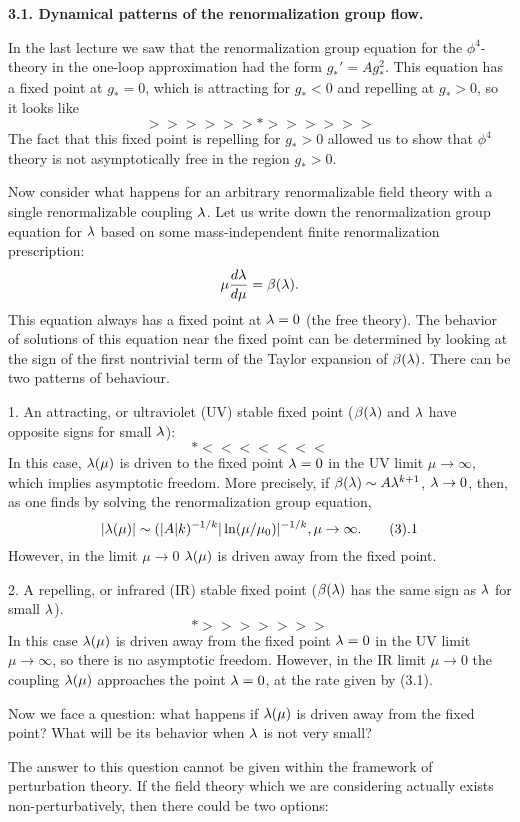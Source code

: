 {\bf 3.1. Dynamical patterns of the renormalization group flow.} 

In the last lecture we saw that the renormalization group equation
for the $\phi^4$-theory in the one-loop approximation had the form
$g_*'=Ag_*^2$. This equation has a fixed point at $g_*=0$, which is attracting
for $g_*<0$ and repelling at $g_*>0$, so it looks like
$$
>>>>>>*>>>>>> 
$$
The fact that this fixed point is repelling for $g_*>0$ allowed us to 
show that $\phi^4$ theory is not asymptotically free in the region $g_*>0$. 

Now consider  what happens for an arbitrary renormalizable field theory
with a single renormalizable coupling $\lambda$. 
Let us write down the renormalization group equation for $\lambda$ based on
some mass-independent finite renormalization prescription:
$$
\mu\frac{d\lambda}{d\mu}=\beta(\lambda).
$$
This equation always has a fixed point at $\lambda=0$ (the free theory). 
The behavior of solutions of this equation near the fixed point can be 
determined by looking at the sign of 
the first nontrivial term of the Taylor expansion 
of $\beta(\lambda)$. There can be two patterns of behaviour. 

1. An attracting, or
ultraviolet (UV) stable fixed point ($\beta(\lambda)$ and $\lambda$ have 
opposite signs for small $\lambda$):
$$
*<<<<<<<
$$
In this case, 
$\lambda(\mu)$ is driven to the fixed point $\lambda=0$ 
in the UV limit $\mu\to \infty$, which implies 
asymptotic freedom. More precisely, if $\beta(\lambda)\sim A\lambda^{k+1}$, $\lambda\to 0$, 
then, as one finds by solving the renormalization group equation, 
$$
|\l(\mu)|\sim (|A|k)^{-1/k}|\ln(\mu/\mu_0)|^{-1/k}, \mu\to\infty.\tag 3.1
$$
However, in the limit $\mu\to 0$ 
$\lambda(\mu)$ is driven away from the fixed point. 

2. A repelling, or infrared (IR) stable 
fixed point ($\beta(\lambda)$ has the same sign as $\lambda$ for small $\lambda$).
$$
*>>>>>>>
$$
In this case $\lambda(\mu)$ is driven away from the fixed point $\lambda=0$
in the UV limit $\mu\to \infty$, so there is no asymptotic freedom. 
However, in the IR limit $\mu\to 0$ the coupling $\lambda(\mu)$ approaches the 
point $\lambda=0$, at the rate given by (3.1).  

Now we face a question: what happens if $\lambda(\mu)$ is 
driven away from the fixed point? What will be its behavior 
when $\lambda$ is not very small? 

The answer to this question cannot be given within the framework 
of perturbation theory. If the field theory which we are considering 
actually exists non-perturbatively, then there could be two options:


